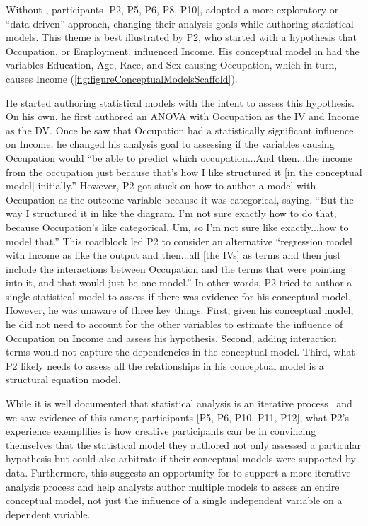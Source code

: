 Without \rTisane, participants [P2, P5, P6, P8, P10], adopted a more exploratory
or ``data-driven'' approach, changing their analysis goals while authoring
statistical models. This theme is best illustrated by P2, who started with a
hypothesis that Occupation, or Employment, influenced Income. His conceptual
model in \rTisane had the variables Education, Age, Race, and Sex causing
Occupation, which in turn, causes Income (\autoref{fig:figureConceptualModelsScaffold}). 

He started authoring statistical models with the intent to assess this
hypothesis. On his own, he first authored an ANOVA with Occupation as the IV and
Income as the DV. Once he saw that Occupation had a statistically significant
influence on Income, he changed his analysis goal to assessing if the variables
causing Occupation would ``be able to predict which occupation...And then...the
income from the occupation just because that’s how I like structured it [in the
conceptual model] initially.'' However, P2 got stuck on how to author a model
with Occupation as the outcome variable because it was categorical, saying,
``But the way I structured it in like the diagram. I'm not sure exactly how to
do that, because Occupation's like categorical. Um, so I'm not sure like
exactly...how to model that.'' This roadblock led P2 to consider an alternative
``regression model with Income as like the output and then...all [the IVs] as
terms and then just include the interactions between Occupation and the terms
that were pointing into it, and that would just be one model.'' In other words,
P2 tried to author a single statistical model to assess if there was evidence
for his conceptual model. However, he was unaware of three key things. First,
given his conceptual model, he did not need to account for the other variables
to estimate the influence of Occupation on Income and assess his hypothesis.
Second, adding interaction terms would not capture the dependencies in the
conceptual model. Third, what P2 likely needs to assess all the relationships in
his conceptual model is a structural equation model.

While it is well documented that statistical analysis is an iterative
process~\cite{grolemund2014cognitive, jun2022hypoForm} and we saw evidence of
this among participants [P5, P6, P10, P11, P12], what P2's experience
exemplifies is how creative participants can be in convincing themselves that the
statistical model they authored not only assessed a particular hypothesis but
could also arbitrate if their conceptual models were supported by data.
Furthermore, this suggests an opportunity for \rTisane to support a more
iterative analysis process and help analysts author multiple models to assess an
entire conceptual model, not just the influence of a single independent variable
on a dependent variable. 

